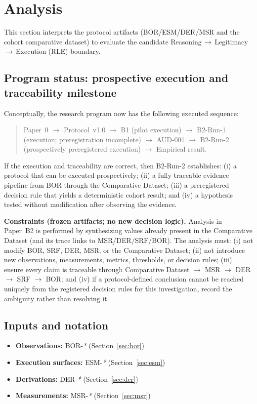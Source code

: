 \section{Analysis}
\label{sec:analysis}
This section interprets the protocol artifacts (BOR/ESM/DER/MSR and the cohort comparative dataset) to evaluate the candidate Reasoning\,$\rightarrow$\,Legitimacy\,$\rightarrow$\,Execution (RLE) boundary.

\subsection{Program status: prospective execution and traceability milestone}
Conceptually, the research program now has the following executed sequence:
\begin{quote}
Paper~0 $\rightarrow$ Protocol~v1.0 $\rightarrow$ B1 (pilot execution) $\rightarrow$ B2-Run-1 (execution; preregistration incomplete) $\rightarrow$ AUD-001 $\rightarrow$ B2-Run-2 (prospectively preregistered execution) $\rightarrow$ Empirical result.
\end{quote}

If the execution and traceability are correct, then B2-Run-2 establishes: (i) a protocol that can be executed prospectively; (ii) a fully traceable evidence pipeline from BOR through the Comparative Dataset; (iii) a preregistered decision rule that yields a deterministic cohort result; and (iv) a hypothesis tested without modification after observing the evidence.

\textbf{Constraints (frozen artifacts; no new decision logic).} Analysis in Paper~B2 is performed by synthesizing values already present in the Comparative Dataset (and its trace links to MSR/DER/SRF/BOR). The analysis must: (i) not modify BOR, SRF, DER, MSR, or the Comparative Dataset; (ii) not introduce new observations, measurements, metrics, thresholds, or decision rules; (iii) ensure every claim is traceable through Comparative Dataset $\rightarrow$ MSR $\rightarrow$ DER $\rightarrow$ SRF $\rightarrow$ BOR; and (iv) if a protocol-defined conclusion cannot be reached uniquely from the registered decision rules for this investigation, record the ambiguity rather than resolving it.

\subsection{Inputs and notation}
\begin{itemize}
  \item \textbf{Observations:} BOR-\emph{*} (Section~\ref{sec:bor})
  \item \textbf{Execution surfaces:} ESM-\emph{*} (Section~\ref{sec:esm})
  \item \textbf{Derivations:} DER-\emph{*} (Section~\ref{sec:der})
  \item \textbf{Measurements:} MSR-\emph{*} (Section~\ref{sec:msr})
\end{itemize}


